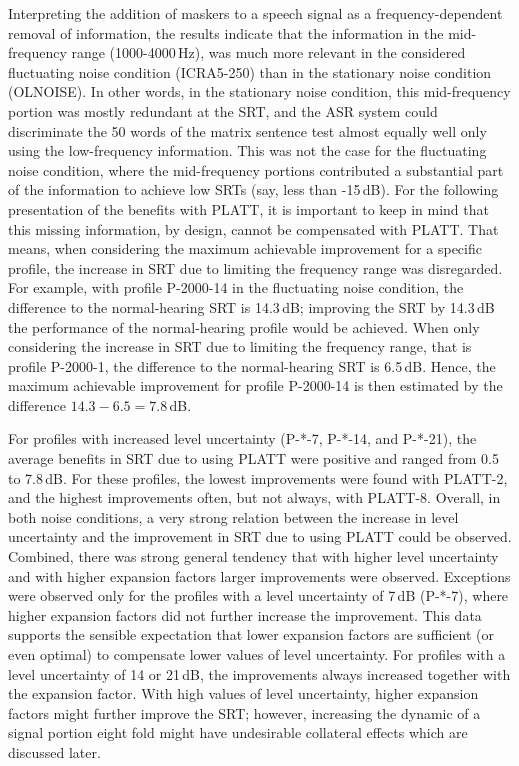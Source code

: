 \documentclass[10pt,a4paper,twocolumn]{article}
\begin{document}
Interpreting the addition of maskers to a speech signal as a frequency-dependent removal of information, the results indicate that the information in the mid-frequency range (1000-4000\,Hz), was much more relevant in the considered fluctuating noise condition (ICRA5-250) than in the stationary noise condition (OLNOISE).
%
In other words, in the stationary noise condition, this mid-frequency portion was mostly redundant at the SRT, and the ASR system could discriminate the 50 words of the matrix sentence test almost equally well only using the low-frequency information.
%
This was not the case for the fluctuating noise condition, where the mid-frequency portions contributed a substantial part of the information to achieve low SRTs (say, less than -15\,dB).
%
For the following presentation of the benefits with PLATT, it is important to keep in mind that this missing information, by design, cannot be compensated with PLATT.
%
That means, when considering the maximum achievable improvement for a specific profile, the increase in SRT due to limiting the frequency range was disregarded.
%
For example, with profile P-2000-14 in the fluctuating noise condition, the difference to the normal-hearing SRT is 14.3\,dB; improving the SRT by 14.3\,dB the performance of the normal-hearing profile would be achieved.
%
When only considering the increase in SRT due to limiting the frequency range, that is profile P-2000-1, the difference to the normal-hearing SRT is 6.5\,dB.
%
Hence, the maximum achievable improvement for profile P-2000-14 is then estimated by the difference $14.3-6.5=7.8$\,dB.

For profiles with increased level uncertainty (P-*-7, P-*-14, and P-*-21), the average benefits in SRT due to using PLATT were positive and ranged from 0.5 to 7.8\,dB.
%
For these profiles, the lowest improvements were found with PLATT-2, and the highest improvements often, but not always, with PLATT-8.
%
Overall, in both noise conditions, a very strong relation between the increase in level uncertainty and the improvement in SRT due to using PLATT could be observed.
%
Combined, there was strong general tendency that with higher level uncertainty and with higher expansion factors larger improvements were observed.
%
Exceptions were observed only for the profiles with a level uncertainty of 7\,dB (P-*-7), where higher expansion factors did not further increase the improvement.
%
This data supports the sensible expectation that lower expansion factors are sufficient (or even optimal) to compensate lower values of level uncertainty.
%
For profiles with a level uncertainty of 14 or 21\,dB, the improvements always increased together with the expansion factor.
%
With high values of level uncertainty, higher expansion factors might further improve the SRT; however, increasing the dynamic of a signal portion eight fold might have undesirable collateral effects which are discussed later.
\end{document}
